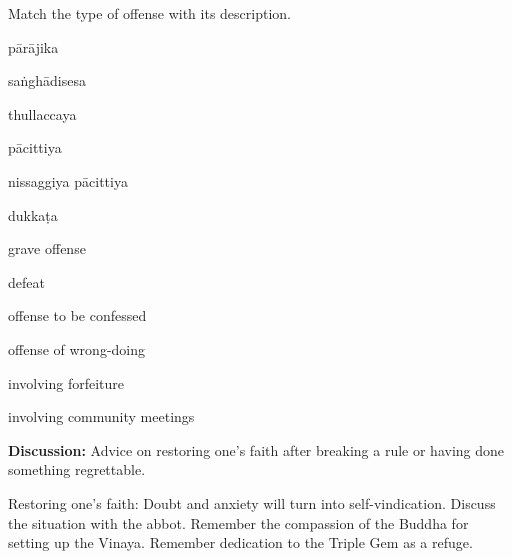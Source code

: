 \begin{exam}{\autoExamName}
\begin{problem}
\end{problem}

\problemDivide

\begin{problem*}

  Match the type of offense with its description.

  \bigskip

  \begin{multicols}{2}

    \begin{parts}

    \item \fillin{2cm}{\ref{parajika}} pārājika
    \item \fillin{2cm}{\ref{sanghadisesa}} saṅghādisesa
    \item \fillin{2cm}{\ref{thullacaya}} thullaccaya
    \item \fillin{2cm}{\ref{pacittiya}} pācittiya
    \item \fillin{2cm}{\ref{nissaggiya}} nissaggiya pācittiya
    \item \fillin{2cm}{\ref{dukkata}} dukkaṭa

    \columnbreak

    \bMatchChoices

    \item\label{thullacaya} grave offense
    \item\label{parajika} defeat
    \item\label{pacittiya} offense to be confessed
    \item\label{dukkata} offense of wrong-doing
    \item\label{nissaggiya} involving forfeiture
    \item\label{sanghadisesa} involving community meetings

    \eMatchChoices
      
    \end{parts}
    
  \end{multicols}

  \bigskip

  \textbf{Discussion:} Advice on restoring one's faith after breaking a rule or
  having done something regrettable.

  \begin{solution}
    Restoring one's faith: Doubt and anxiety will turn into self-vindication.
    Discuss the situation with the abbot. Remember the compassion of the Buddha
    for setting up the Vinaya. Remember dedication to the Triple Gem as a
    refuge.
  \end{solution}


\end{problem*}
\end{exam}
